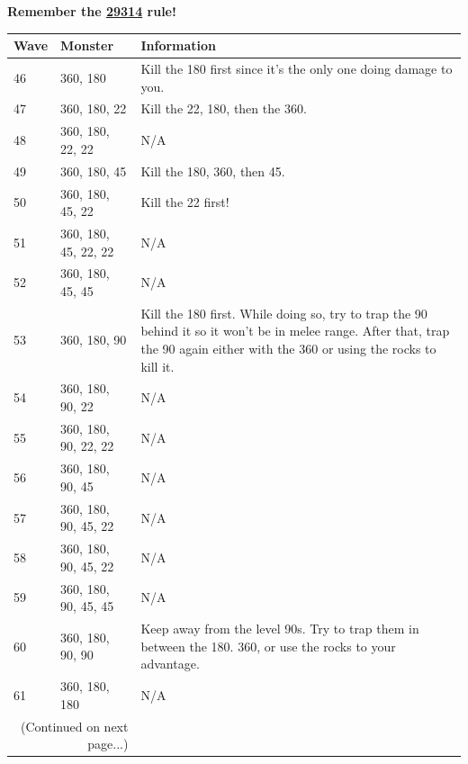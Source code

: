 \documentclass{article}
\newlength\myheight
\newlength\mydepth
\newcommand*\inlinegraphics[1]{%
  \settototalheight\myheight{Xygp}%
  \settodepth\mydepth{Xygp}%
  \raisebox{-\mydepth}{\texttt{[image: \#1]}}%
}
\begin{document}
\huge  \inlinegraphics{jad.png}  \textbf{Remember the \underline{29314} rule!}\inlinegraphics{jad.png}    
\begin{table}[!htbt]
    \begin{tabular}{  l  p{3.4cm}  p{3.4cm} }
        \toprule
\textbf{Wave}      
& \textbf{Monster}   
& \textbf{Information} \\\midrule

46 & 360, 180 & Kill the 180 first since it's the only one doing damage to you. \\\hline

47 & 360, 180, 22 & Kill the 22, 180, then the 360. \\\hline

48 & 360, 180, 22, 22 & N/A \\\hline

49 & 360, 180, 45 & Kill the 180, 360, then 45. \\\hline

50 & 360, 180, 45, 22 & Kill the 22 first! \\\hline

51 & 360, 180, 45, 22, 22 & N/A \\\hline

52 & 360, 180, 45, 45 & N/A \\\hline

53 & 360, 180, 90 & Kill the 180 first. While doing so, try to trap the 90 behind it so it won't be in melee range. After that, trap the 90 again either with the 360 or using the rocks to kill it. \\\hline

54 & 360, 180, 90, 22 & N/A \\\hline

55 & 360, 180, 90, 22, 22 & N/A \\\hline

56 & 360, 180, 90, 45 & N/A \\\hline

57 & 360, 180, 90, 45, 22 & N/A \\\hline

58 & 360, 180, 90, 45, 22 & N/A \\\hline

59 & 360, 180, 90,  45, 45 & N/A \\\hline

60 & 360, 180, 90, 90 & Keep away from the level 90s. Try to trap them in between the 180. 360, or use the rocks to your advantage. \\\hline

61 & 360, 180, 180  & N/A \\\hline 
     \bottomrule
        \multicolumn{2}{r}{\footnotesize(Continued on next page...)}
    \end{tabular}
\end{table}
\newpage
\end{document}
